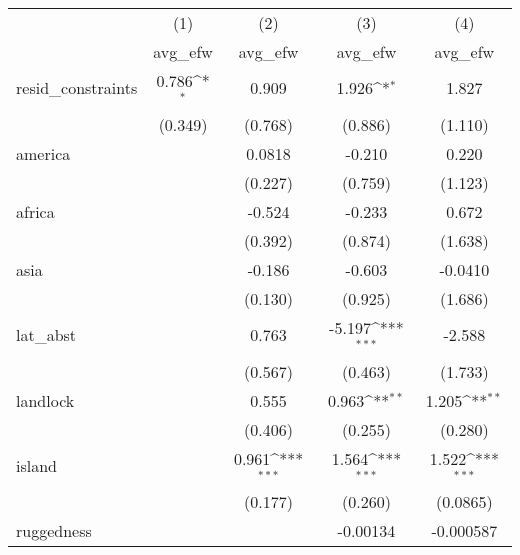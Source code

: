 {
\def\sym#1{\ifmmode^{#1}\else\(^{#1}\)\fi}
\begin{tabular}{l*{4}{c}}
\hline\hline
            &\multicolumn{1}{c}{(1)}&\multicolumn{1}{c}{(2)}&\multicolumn{1}{c}{(3)}&\multicolumn{1}{c}{(4)}\\
            &\multicolumn{1}{c}{avg\_efw}&\multicolumn{1}{c}{avg\_efw}&\multicolumn{1}{c}{avg\_efw}&\multicolumn{1}{c}{avg\_efw}\\
\hline
resid\_constraints&       0.786\sym{*}  &       0.909         &       1.926\sym{*}  &       1.827         \\
            &     (0.349)         &     (0.768)         &     (0.886)         &     (1.110)         \\
[1em]
america     &                     &      0.0818         &      -0.210         &       0.220         \\
            &                     &     (0.227)         &     (0.759)         &     (1.123)         \\
[1em]
africa      &                     &      -0.524         &      -0.233         &       0.672         \\
            &                     &     (0.392)         &     (0.874)         &     (1.638)         \\
[1em]
asia        &                     &      -0.186         &      -0.603         &     -0.0410         \\
            &                     &     (0.130)         &     (0.925)         &     (1.686)         \\
[1em]
lat\_abst    &                     &       0.763         &      -5.197\sym{***}&      -2.588         \\
            &                     &     (0.567)         &     (0.463)         &     (1.733)         \\
[1em]
landlock    &                     &       0.555         &       0.963\sym{**} &       1.205\sym{**} \\
            &                     &     (0.406)         &     (0.255)         &     (0.280)         \\
[1em]
island      &                     &       0.961\sym{***}&       1.564\sym{***}&       1.522\sym{***}\\
            &                     &     (0.177)         &     (0.260)         &    (0.0865)         \\
[1em]
ruggedness  &                     &                     &    -0.00134         &   -0.000587         \\

\end{tabular}}
